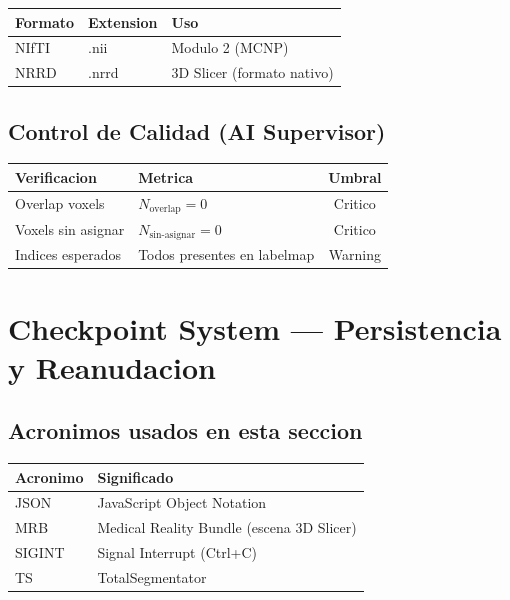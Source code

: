 \documentclass[12pt,a4paper]{article}
\begin{document}
\begin{table}[H]
\centering
\begin{tabular}{l l l}
\toprule
\textbf{Formato} & \textbf{Extension} & \textbf{Uso} \\
\midrule
NIfTI & .nii & Modulo 2 (MCNP) \\
NRRD & .nrrd & 3D Slicer (formato nativo) \\
\bottomrule
\end{tabular}
\end{table}

\subsection{Control de Calidad (AI Supervisor)}

\begin{table}[H]
\centering
\begin{tabular}{llc}
\toprule
\textbf{Verificacion} & \textbf{Metrica} & \textbf{Umbral} \\
\midrule
Overlap voxels & $N_{\text{overlap}} = 0$ & Critico \\
Voxels sin asignar & $N_{\text{sin-asignar}} = 0$ & Critico \\
Indices esperados & Todos presentes en labelmap & Warning \\
\bottomrule
\end{tabular}
\end{table}

\newpage

\section{Checkpoint System --- Persistencia y Reanudacion}
\label{sec:checkpoint}

\subsection*{Acronimos usados en esta seccion}
\begin{tabular}{ll}
\toprule
\textbf{Acronimo} & \textbf{Significado} \\
\midrule
JSON & JavaScript Object Notation \\
MRB & Medical Reality Bundle (escena 3D Slicer) \\
SIGINT & Signal Interrupt (Ctrl+C) \\
TS & TotalSegmentator \\
\bottomrule
\end{tabular}
\end{document}
